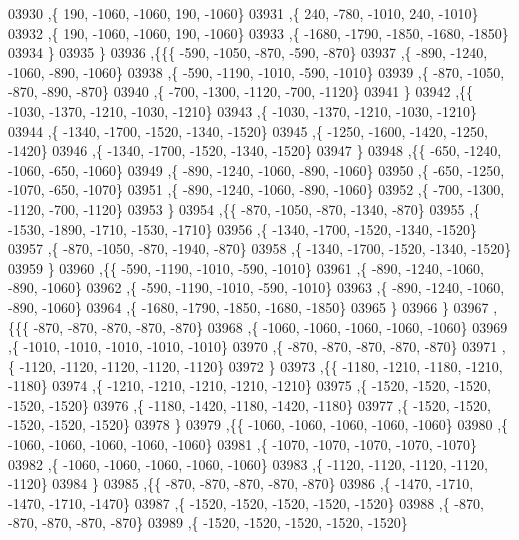 \begin{DoxyCode}
03930     ,\{   190, -1060, -1060,   190, -1060\}
03931     ,\{   240,  -780, -1010,   240, -1010\}
03932     ,\{   190, -1060, -1060,   190, -1060\}
03933     ,\{ -1680, -1790, -1850, -1680, -1850\}
03934     \}
03935    \}
03936   ,\{\{\{  -590, -1050,  -870,  -590,  -870\}
03937     ,\{  -890, -1240, -1060,  -890, -1060\}
03938     ,\{  -590, -1190, -1010,  -590, -1010\}
03939     ,\{  -870, -1050,  -870,  -890,  -870\}
03940     ,\{  -700, -1300, -1120,  -700, -1120\}
03941     \}
03942    ,\{\{ -1030, -1370, -1210, -1030, -1210\}
03943     ,\{ -1030, -1370, -1210, -1030, -1210\}
03944     ,\{ -1340, -1700, -1520, -1340, -1520\}
03945     ,\{ -1250, -1600, -1420, -1250, -1420\}
03946     ,\{ -1340, -1700, -1520, -1340, -1520\}
03947     \}
03948    ,\{\{  -650, -1240, -1060,  -650, -1060\}
03949     ,\{  -890, -1240, -1060,  -890, -1060\}
03950     ,\{  -650, -1250, -1070,  -650, -1070\}
03951     ,\{  -890, -1240, -1060,  -890, -1060\}
03952     ,\{  -700, -1300, -1120,  -700, -1120\}
03953     \}
03954    ,\{\{  -870, -1050,  -870, -1340,  -870\}
03955     ,\{ -1530, -1890, -1710, -1530, -1710\}
03956     ,\{ -1340, -1700, -1520, -1340, -1520\}
03957     ,\{  -870, -1050,  -870, -1940,  -870\}
03958     ,\{ -1340, -1700, -1520, -1340, -1520\}
03959     \}
03960    ,\{\{  -590, -1190, -1010,  -590, -1010\}
03961     ,\{  -890, -1240, -1060,  -890, -1060\}
03962     ,\{  -590, -1190, -1010,  -590, -1010\}
03963     ,\{  -890, -1240, -1060,  -890, -1060\}
03964     ,\{ -1680, -1790, -1850, -1680, -1850\}
03965     \}
03966    \}
03967   ,\{\{\{  -870,  -870,  -870,  -870,  -870\}
03968     ,\{ -1060, -1060, -1060, -1060, -1060\}
03969     ,\{ -1010, -1010, -1010, -1010, -1010\}
03970     ,\{  -870,  -870,  -870,  -870,  -870\}
03971     ,\{ -1120, -1120, -1120, -1120, -1120\}
03972     \}
03973    ,\{\{ -1180, -1210, -1180, -1210, -1180\}
03974     ,\{ -1210, -1210, -1210, -1210, -1210\}
03975     ,\{ -1520, -1520, -1520, -1520, -1520\}
03976     ,\{ -1180, -1420, -1180, -1420, -1180\}
03977     ,\{ -1520, -1520, -1520, -1520, -1520\}
03978     \}
03979    ,\{\{ -1060, -1060, -1060, -1060, -1060\}
03980     ,\{ -1060, -1060, -1060, -1060, -1060\}
03981     ,\{ -1070, -1070, -1070, -1070, -1070\}
03982     ,\{ -1060, -1060, -1060, -1060, -1060\}
03983     ,\{ -1120, -1120, -1120, -1120, -1120\}
03984     \}
03985    ,\{\{  -870,  -870,  -870,  -870,  -870\}
03986     ,\{ -1470, -1710, -1470, -1710, -1470\}
03987     ,\{ -1520, -1520, -1520, -1520, -1520\}
03988     ,\{  -870,  -870,  -870,  -870,  -870\}
03989     ,\{ -1520, -1520, -1520, -1520, -1520\}

\end{DoxyCode}
